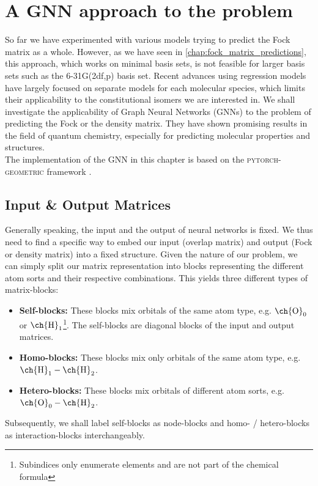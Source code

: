\chapter{A GNN approach to the problem}
\label{chap:gnn}
So far we have experimented with various models trying to predict the Fock matrix as a whole. However, as we have seen in \autoref{chap:fock_matrix_predictions}, this approach, which works on minimal basis sets, is not feasible for larger basis sets such as the 6-31G(2df,p) basis set. Recent advances using regression models have largely focused on separate models for each molecular species, which limits their applicability to the constitutional isomers we are interested in. \parencite{ref:Hazra2024,ref:Shao2023}
We shall investigate the applicability of Graph Neural Networks (GNNs) to the problem of predicting the Fock or the density matrix. They have shown promising results in the field of quantum chemistry, especially for predicting molecular properties and structures. \parencite{ref:schnet2018}\\

The implementation of the GNN in this chapter is based on the \textsc{pytorch-geometric} framework \parencite{ref:PyTorchGeometric, ref:PyTorch_geom_paper}. 
\section{Input \& Output Matrices}
\label{sec:gnn_input_output_matrices}
Generally speaking, the input and the output of neural networks is fixed. We thus need to find a specific way to embed our input (overlap matrix) and output (Fock or density matrix) into a fixed structure. Given the nature of our problem, we can simply split our matrix representation into blocks representing the different atom sorts and their respective combinations. This yields three different types of matrix-blocks: 
\begin{itemize}
    \item \textbf{Self-blocks:} These blocks mix orbitals of the same atom type, e.g. $\text{\ch{O}}_0$ or $\text{\ch{H}}_1$\footnote{Subindices only enumerate elements and are not part of the chemical formula}. The self-blocks are diagonal blocks of the input and output matrices.
    \item \textbf{Homo-blocks:} These blocks mix only orbitals of the same atom type, e.g. $\text{\ch{H}}_1 - \text{\ch{H}}_2$.
    \item \textbf{Hetero-blocks:} These blocks mix orbitals of different atom sorts, e.g. $\text{\ch{O}}_0 - \text{\ch{H}}_2$.
\end{itemize}
Subsequently, we shall label self-blocks as node-blocks and homo- / hetero-blocks as interaction-blocks interchangeably. 

